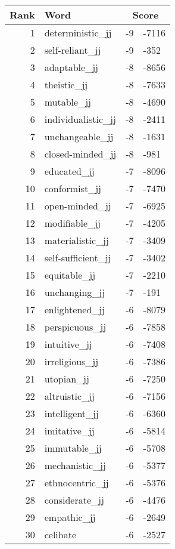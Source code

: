 \begin{longtable}[!htbp]{| rlr@{.}l |}
    \hline
    \textbf{Rank} & \textbf{Word} & \multicolumn{2}{c|}{\textbf{Score}} \\
    \hline
    \endhead
    1 & deterministic\_jj & -9 & -7116 \\
    2 & self-reliant\_jj & -9 & -352 \\
    3 & adaptable\_jj & -8 & -8656 \\
    4 & theistic\_jj & -8 & -7633 \\
    5 & mutable\_jj & -8 & -4690 \\
    6 & individualistic\_jj & -8 & -2411 \\
    7 & unchangeable\_jj & -8 & -1631 \\
    8 & closed-minded\_jj & -8 & -981 \\
    9 & educated\_jj & -7 & -8096 \\
    10 & conformist\_jj & -7 & -7470 \\
    11 & open-minded\_jj & -7 & -6925 \\
    12 & modifiable\_jj & -7 & -4205 \\
    13 & materialistic\_jj & -7 & -3409 \\
    14 & self-sufficient\_jj & -7 & -3402 \\
    15 & equitable\_jj & -7 & -2210 \\
    16 & unchanging\_jj & -7 & -191 \\
    17 & enlightened\_jj & -6 & -8079 \\
    18 & perspicuous\_jj & -6 & -7858 \\
    19 & intuitive\_jj & -6 & -7408 \\
    20 & irreligious\_jj & -6 & -7386 \\
    21 & utopian\_jj & -6 & -7250 \\
    22 & altruistic\_jj & -6 & -7156 \\
    23 & intelligent\_jj & -6 & -6360 \\
    24 & imitative\_jj & -6 & -5814 \\
    25 & immutable\_jj & -6 & -5708 \\
    26 & mechanistic\_jj & -6 & -5377 \\
    27 & ethnocentric\_jj & -6 & -5376 \\
    28 & considerate\_jj & -6 & -4476 \\
    29 & empathic\_jj & -6 & -2649 \\
    30 & celibate & -6 & -2527 \\

\end{longtable}
